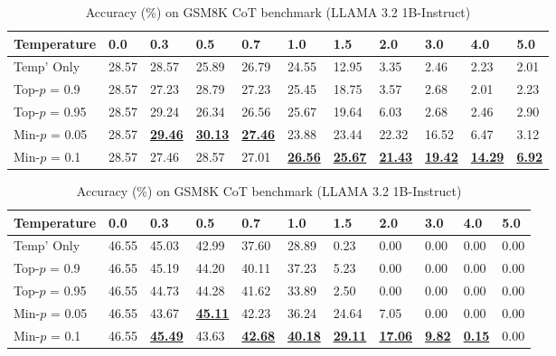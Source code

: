 \documentclass{article}
\begin{document}
\begin{table*}[ht]
\centering
\caption{Accuracy (\%) on {GPQA Main or GSM8K CoT} benchmark for Llama 3 models}
\label{tab:merged_llama_results}
\begin{subtable}[t]{\textwidth}
\centering
\caption{Accuracy (\%) on GPQA Main benchmark (LLAMA 3.2 1B-Instruct)}
\vspace{-0.5em}
\begin{tabular}{lllllllllll}
\toprule
Temperature & 0.0 & 0.3 & 0.5 & 0.7 & 1.0 & 1.5 & 2.0 & 3.0 & 4.0 & 5.0 \\
\midrule
Temp' Only & 28.57 & 28.57 & 25.89 & 26.79 & 24.55 & 12.95 & 3.35 & 2.46 & 2.23 & 2.01 \\
Top-\(p\) = 0.9 & 28.57 & 27.23 & 28.79 & 27.23 & 25.45 & 18.75 & 3.57 & 2.68 & 2.01 & 2.23 \\
Top-\(p\) = 0.95 & 28.57 & 29.24 & 26.34 & 26.56 & 25.67 & 19.64 & 6.03 & 2.68 & 2.46 & 2.90 \\
Min-\(p\) = 0.05 & 28.57 & \textbf{\underline{29.46}} & \textbf{\underline{30.13}} & \textbf{\underline{27.46}} & 23.88 & 23.44 & 22.32 & 16.52 & 6.47 & 3.12 \\
Min-\(p\) = 0.1 & 28.57 & 27.46 & 28.57 & 27.01 & \textbf{\underline{26.56}} & \textbf{\underline{25.67}} & \textbf{\underline{21.43}} & \textbf{\underline{19.42}} & \textbf{\underline{14.29}} & \textbf{\underline{6.92}} \\
\bottomrule
\end{tabular}
\end{subtable}


\vspace{0.5em}
\begin{subtable}[t]{\textwidth}
\centering

\caption{Accuracy (\%) on GSM8K CoT benchmark (LLAMA 3.2 1B-Instruct)}
\vspace{-0.5em}
\begin{tabular}{lllllllllll}
\toprule
Temperature & 0.0 & 0.3 & 0.5 & 0.7 & 1.0 & 1.5 & 2.0 & 3.0 & 4.0 & 5.0 \\
\midrule
Temp' Only & 46.55 & 45.03 & 42.99 & 37.60 & 28.89 & 0.23 & 0.00 & 0.00 & 0.00 & 0.00 \\
Top-\(p\) = 0.9 & 46.55 & 45.19 & 44.20 & 40.11 & 37.23 & 5.23 & 0.00 & 0.00 & 0.00 & 0.00 \\
Top-\(p\) = 0.95 & 46.55 & 44.73 & 44.28 & 41.62 & 33.89 & 2.50 & 0.00 & 0.00 & 0.00 & 0.00 \\
Min-\(p\) = 0.05 & 46.55 & 43.67 & \textbf{\underline{45.11}} & 42.23 & 36.24 & 24.64 & 7.05 & 0.00 & 0.00 & 0.00 \\
Min-\(p\) = 0.1 & 46.55 & \textbf{\underline{45.49}} & 43.63 & \textbf{\underline{42.68}} & \textbf{\underline{40.18}} & \textbf{\underline{29.11}} & \textbf{\underline{17.06}} & \textbf{\underline{9.82}} & \textbf{\underline{0.15}} & 0.00 \\
\bottomrule
\end{tabular}
\end{subtable}


\end{table*}
\end{document}
